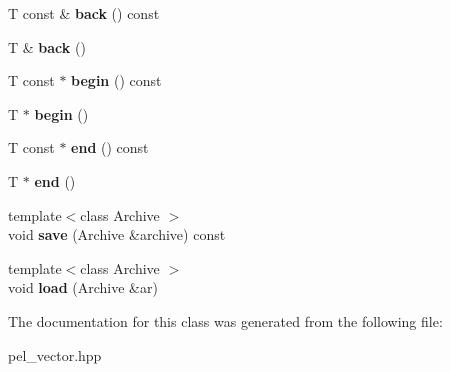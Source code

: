 \begin{DoxyCompactItemize}
\item 
\hypertarget{classpel_1_1vector_a7ffd9ceafc8227b958351de69ceac755}{}T const \& {\bfseries back} () const \label{classpel_1_1vector_a7ffd9ceafc8227b958351de69ceac755}

\item 
\hypertarget{classpel_1_1vector_ab9c4a181ce5c09f1e47f52e2760ab315}{}T \& {\bfseries back} ()\label{classpel_1_1vector_ab9c4a181ce5c09f1e47f52e2760ab315}

\item 
\hypertarget{classpel_1_1vector_a12270dde87bc5e86edc9da5b9a9c8afe}{}T const $\ast$ {\bfseries begin} () const \label{classpel_1_1vector_a12270dde87bc5e86edc9da5b9a9c8afe}

\item 
\hypertarget{classpel_1_1vector_a560f69b5b3606d64647b03d84f5c1bbe}{}T $\ast$ {\bfseries begin} ()\label{classpel_1_1vector_a560f69b5b3606d64647b03d84f5c1bbe}

\item 
\hypertarget{classpel_1_1vector_acc2a2cb89452d1d48331142ebeb6e64f}{}T const $\ast$ {\bfseries end} () const \label{classpel_1_1vector_acc2a2cb89452d1d48331142ebeb6e64f}

\item 
\hypertarget{classpel_1_1vector_a6ecf739d2fa411fd741705a867e0a933}{}T $\ast$ {\bfseries end} ()\label{classpel_1_1vector_a6ecf739d2fa411fd741705a867e0a933}

\item 
\hypertarget{classpel_1_1vector_ae03ff9ad2a6bab1da732ffb692b4fa0e}{}{\footnotesize template$<$class Archive $>$ }\\void {\bfseries save} (Archive \&archive) const \label{classpel_1_1vector_ae03ff9ad2a6bab1da732ffb692b4fa0e}

\item 
\hypertarget{classpel_1_1vector_aa2c7a53b1379cdebd3a17533a14a18cb}{}{\footnotesize template$<$class Archive $>$ }\\void {\bfseries load} (Archive \&ar)\label{classpel_1_1vector_aa2c7a53b1379cdebd3a17533a14a18cb}

\end{DoxyCompactItemize}


The documentation for this class was generated from the following file\+:\begin{DoxyCompactItemize}
\item 
pel\+\_\+vector.\+hpp\end{DoxyCompactItemize}
